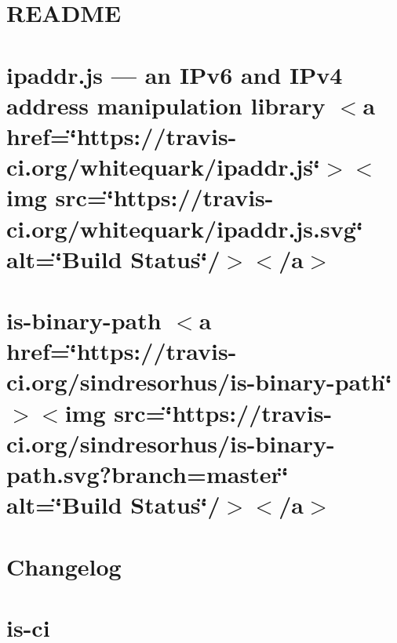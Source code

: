 \let\mypdfximage\pdfximage\def\pdfximage{\immediate\mypdfximage}\documentclass[twoside]{book}
\newcommand{\+}{\discretionary{\mbox{\scriptsize$\hookleftarrow$}}{}{}}
\begin{document}
\chapter{R\+E\+A\+D\+ME}
\label{md__c_1__git_hub__p_r_o_y_e_c_t_o-_i_i_i-_g_o_t_rest-api_node_modules_ini__r_e_a_d_m_e}

\chapter{ipaddr.\+js — an I\+Pv6 and I\+Pv4 address manipulation library $<$a href=\char`\"{}https\+://travis-\/ci.\+org/whitequark/ipaddr.\+js\char`\"{}$>$$<$img src=\char`\"{}https\+://travis-\/ci.\+org/whitequark/ipaddr.\+js.\+svg\char`\"{} alt=\char`\"{}\+Build Status\char`\"{}/$>$$<$/a$>$}
\label{md__c_1__git_hub__p_r_o_y_e_c_t_o-_i_i_i-_g_o_t_rest-api_node_modules_ipaddr_8js__r_e_a_d_m_e}

\chapter{is-\/binary-\/path $<$a href=\char`\"{}https\+://travis-\/ci.\+org/sindresorhus/is-\/binary-\/path\char`\"{}$>$$<$img src=\char`\"{}https\+://travis-\/ci.\+org/sindresorhus/is-\/binary-\/path.\+svg?branch=master\char`\"{} alt=\char`\"{}\+Build Status\char`\"{}/$>$$<$/a$>$}
\label{md__c_1__git_hub__p_r_o_y_e_c_t_o-_i_i_i-_g_o_t_rest-api_node_modules_is-binary-path_readme}

\chapter{Changelog}
\label{md__c_1__git_hub__p_r_o_y_e_c_t_o-_i_i_i-_g_o_t_rest-api_node_modules_is-ci__c_h_a_n_g_e_l_o_g}

\chapter{is-\/ci}
\label{md__c_1__git_hub__p_r_o_y_e_c_t_o-_i_i_i-_g_o_t_rest-api_node_modules_is-ci__r_e_a_d_m_e}

\end{document}
